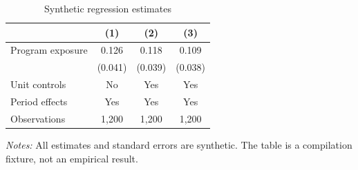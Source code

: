 \begin{table}[H]
\centering
\caption{Synthetic regression estimates}
\label{tab:regression}
\begin{tabular}{lccc}
\toprule
 & (1) & (2) & (3) \\
\midrule
Program exposure & 0.126 & 0.118 & 0.109 \\
 & (0.041) & (0.039) & (0.038) \\
Unit controls & No & Yes & Yes \\
Period effects & Yes & Yes & Yes \\
Observations & 1,200 & 1,200 & 1,200 \\
\bottomrule
\end{tabular}

\vspace{3pt}
\begin{minipage}{.84\textwidth}
\footnotesize\textit{Notes:} All estimates and standard errors are synthetic.
The table is a compilation fixture, not an empirical result.
\end{minipage}
\end{table}
